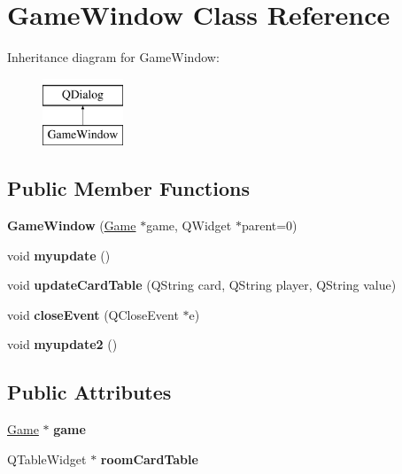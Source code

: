 \hypertarget{classGameWindow}{}\section{Game\+Window Class Reference}
\label{classGameWindow}
Inheritance diagram for Game\+Window\+:\begin{figure}[H]
\begin{center}
\leavevmode
\includegraphics[height=2.000000cm]{classGameWindow}
\end{center}
\end{figure}
\subsection*{Public Member Functions}
\begin{DoxyCompactItemize}
\item 
\mbox{\label{classGameWindow_af2794433e83e7821746b6c8821772ebc}} 
{\bfseries Game\+Window} (\hyperlink{classGame}{Game} $\ast$game, Q\+Widget $\ast$parent=0)
\item 
\mbox{\label{classGameWindow_a4cb00162e90812c2331d1a28ba0b0ebc}} 
void {\bfseries myupdate} ()
\item 
\mbox{\label{classGameWindow_a3506333aeaf3d6e79ec07e3cc20ff21a}} 
void {\bfseries update\+Card\+Table} (Q\+String card, Q\+String player, Q\+String value)
\item 
\mbox{\label{classGameWindow_ac978d7204e47e584a385a3c60d83dd8a}} 
void {\bfseries close\+Event} (Q\+Close\+Event $\ast$e)
\item 
\mbox{\label{classGameWindow_a8dc0b395836425a0f20bde22293b4075}} 
void {\bfseries myupdate2} ()
\end{DoxyCompactItemize}
\subsection*{Public Attributes}
\begin{DoxyCompactItemize}
\item 
\mbox{\label{classGameWindow_a83490ef95c69897b92002b3016de98c9}} 
\hyperlink{classGame}{Game} $\ast$ {\bfseries game}
\item 
\mbox{\label{classGameWindow_a4e7d69a2995175c4a7ebaa2cf082ad1b}} 
Q\+Table\+Widget $\ast$ {\bfseries room\+Card\+Table}
\end{DoxyCompactItemize}
